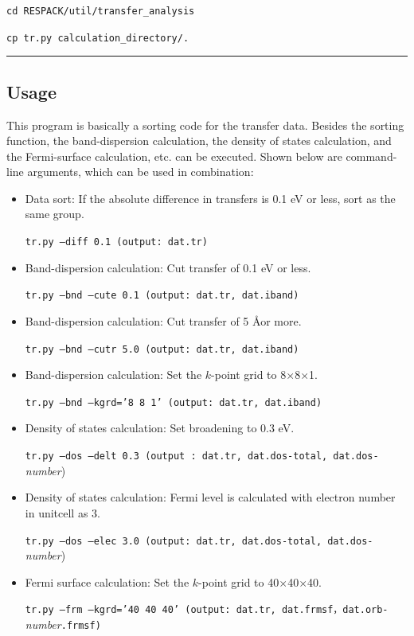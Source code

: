 \documentclass{article}
\begin{document}
\texttt{cd RESPACK/util/transfer\_analysis}

\texttt{cp tr.py calculation\_directory/.}
\vspace{3mm}\hrule\vspace{3mm} 

\subsection{\label{how-to-trpy}Usage}
This program is basically a sorting code for the transfer data. Besides the sorting function, the band-dispersion calculation, the density of states calculation, and the Fermi-surface calculation, etc. can be executed. Shown below are command-line arguments, which can be used in combination: 
\begin{itemize}
\item Data sort: If the absolute difference in transfers is 0.1 eV or less, sort as the same group.

{\tt tr.py --diff 0.1  (output: dat.tr)} 

\item Band-dispersion calculation: Cut transfer of 0.1 eV or less.

{\tt tr.py --bnd --cute 0.1 (output: dat.tr, dat.iband)} 

\item Band-dispersion calculation: Cut transfer of 5 \AA or more.

{\tt tr.py --bnd --cutr 5.0 (output: dat.tr, dat.iband)}

\item Band-dispersion calculation: Set the $k$-point grid to 8$\times$8$\times$1.

{\tt tr.py --bnd --kgrd='8 8 1' (output: dat.tr, dat.iband)}

\item Density of states calculation: Set broadening to 0.3 eV.

{\tt tr.py --dos --delt 0.3 (output : dat.tr, dat.dos-total, dat.dos-}{\it number})

\item Density of states calculation: Fermi level is calculated with electron number in unitcell as 3.

{\tt tr.py --dos --elec 3.0 (output: dat.tr, dat.dos-total, dat.dos-}{\it number})

\item Fermi surface calculation: Set the $k$-point grid to 40$\times$40$\times$40.

{\tt tr.py --frm --kgrd='40 40 40' (output: dat.tr, dat.frmsf，dat.orb-}{\it number}{\tt .frmsf)} 
\end{itemize}
\end{document}

